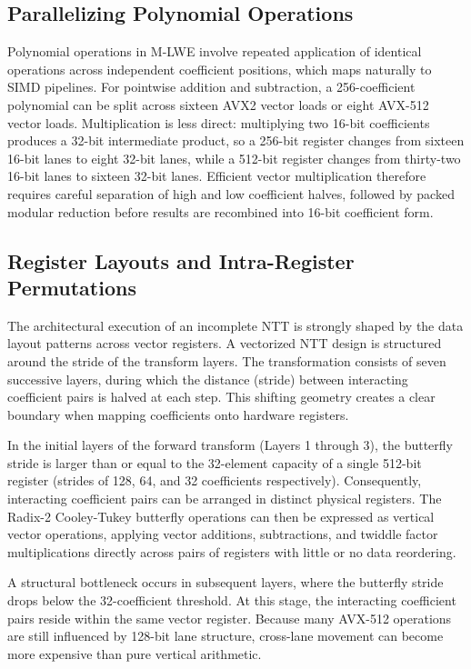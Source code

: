 \subsection{Parallelizing Polynomial Operations}
\label{sub:parallelizing_poly_ops}

Polynomial operations in M-LWE involve repeated application of identical operations across independent coefficient positions, which maps naturally to SIMD pipelines. For pointwise addition and subtraction, a 256-coefficient polynomial can be split across sixteen AVX2 vector loads or eight AVX-512 vector loads. Multiplication is less direct: multiplying two 16-bit coefficients produces a 32-bit intermediate product, so a 256-bit register changes from sixteen 16-bit lanes to eight 32-bit lanes, while a 512-bit register changes from thirty-two 16-bit lanes to sixteen 32-bit lanes. Efficient vector multiplication therefore requires careful separation of high and low coefficient halves, followed by packed modular reduction before results are recombined into 16-bit coefficient form.

\subsection{Register Layouts and Intra-Register Permutations}
\label{sub:register_layouts_permutations}

The architectural execution of an incomplete NTT is strongly shaped by the data layout patterns across vector registers. A vectorized NTT design is structured around the stride of the transform layers. The transformation consists of seven successive layers, during which the distance (stride) between interacting coefficient pairs is halved at each step. This shifting geometry creates a clear boundary when mapping coefficients onto hardware registers.

In the initial layers of the forward transform (Layers 1 through 3), the butterfly stride is larger than or equal to the 32-element capacity of a single 512-bit register (strides of 128, 64, and 32 coefficients respectively). Consequently, interacting coefficient pairs can be arranged in distinct physical registers. The Radix-2 Cooley-Tukey butterfly operations can then be expressed as vertical vector operations, applying vector additions, subtractions, and twiddle factor multiplications directly across pairs of registers with little or no data reordering.

A structural bottleneck occurs in subsequent layers, where the butterfly stride drops below the 32-coefficient threshold. At this stage, the interacting coefficient pairs reside within the same vector register. Because many AVX-512 operations are still influenced by 128-bit lane structure, cross-lane movement can become more expensive than pure vertical arithmetic.

